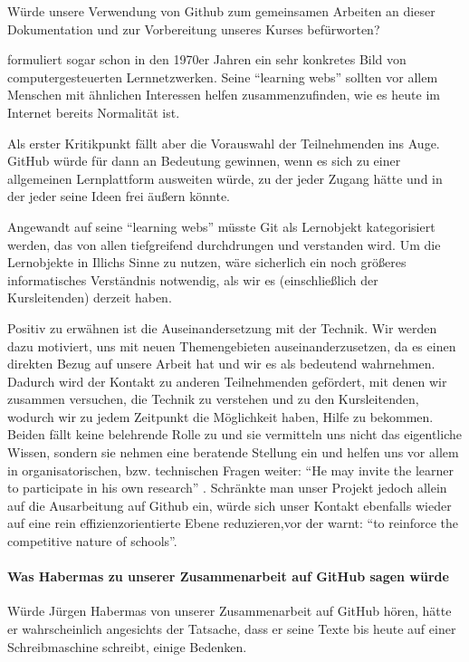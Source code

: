 Würde \citeauthor{Illich-1971} unsere Verwendung von Github zum gemeinsamen Arbeiten an dieser Dokumentation und zur Vorbereitung unseres Kurses befürworten?

\citeauthor{Illich-1971} formuliert sogar schon in den 1970er Jahren ein sehr konkretes Bild von computergesteuerten Lernnetzwerken.
Seine ``learning webs'' sollten vor allem Menschen mit ähnlichen Interessen helfen zusammenzufinden, wie es heute im Internet bereits Normalität ist.

Als erster Kritikpunkt fällt aber die Vorauswahl der Teilnehmenden ins Auge.
GitHub würde für \citeauthor{Illich-1971} dann an Bedeutung gewinnen, wenn es sich zu einer allgemeinen Lernplattform ausweiten würde, zu der jeder Zugang hätte und in der jeder seine Ideen frei äußern könnte.

Angewandt auf seine ``learning webs'' müsste Git als Lernobjekt kategorisiert werden, das von allen tiefgreifend durchdrungen und verstanden wird.
Um die Lernobjekte in Illichs Sinne zu nutzen, wäre sicherlich ein noch größeres informatisches Verständnis notwendig, als wir es (einschließlich der Kursleitenden) derzeit haben.

Positiv zu erwähnen ist die Auseinandersetzung mit der Technik.
Wir werden dazu motiviert, uns mit neuen Themengebieten auseinanderzusetzen, da es einen direkten Bezug auf unsere Arbeit hat und wir es als bedeutend wahrnehmen.
Dadurch wird der Kontakt zu anderen Teilnehmenden gefördert, mit denen wir zusammen versuchen, die Technik zu verstehen und zu den Kursleitenden, wodurch wir zu jedem Zeitpunkt die Möglichkeit haben, Hilfe zu bekommen.
Beiden fällt keine belehrende Rolle zu und sie vermitteln uns nicht das eigentliche Wissen, sondern sie nehmen eine beratende Stellung ein und helfen uns vor allem in organisatorischen, bzw. technischen Fragen weiter:
``He may invite the learner to participate in his own research'' \parencite[43]{Illich-1971}.
Schränkte man unser Projekt jedoch allein auf die Ausarbeitung auf Github ein, würde sich unser Kontakt ebenfalls wieder auf eine rein effizienzorientierte Ebene reduzieren,vor der \textcite[35]{Illich-1971} warnt: ``to reinforce the competitive nature of schools''.


\paragraph{Was Habermas zu unserer Zusammenarbeit auf GitHub sagen würde}

Würde Jürgen Habermas von unserer Zusammenarbeit auf GitHub hören, hätte er wahrscheinlich angesichts der Tatsache, dass er seine Texte bis heute auf einer Schreibmaschine schreibt, einige Bedenken.

